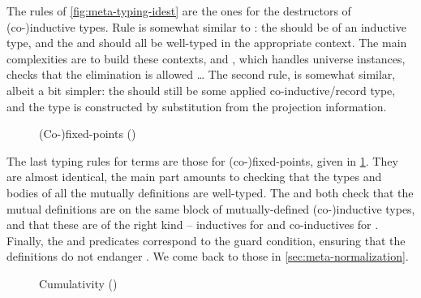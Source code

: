 \begin{figure*}[h]
  \ContinuedFloat
  \caption{(Co-)inductive destructors ()}
  \label{fig:meta-typing-idest}
\end{figure*}

The rules of \cref{fig:meta-typing-idest} are the ones for the destructors of (co-)inductive
types. Rule  is somewhat similar to \eg {}: the 
should be of an inductive type, and the  and  should all be well-typed
in the appropriate context. The main complexities are to build these contexts, and
, which handles universe instances, checks
that the elimination is allowed%
…
The second rule,  is somewhat similar, albeit a bit simpler: the 
should still be some applied co-inductive/record type, and the type is constructed by
substitution from the projection information.

\begin{figure}[h]
  \ContinuedFloat
  \caption{(Co-)fixed-points ()}
  \label{fig:meta-typing-fix}
\end{figure}

The last typing rules for terms are those for (co-)fixed-points,
given in \cref{fig:meta-typing-fix}. They are almost identical,
the main part amounts to checking that the types and bodies of all
the mutually definitions are well-typed.
The  and  both check that the mutual definitions are on
the same block of mutually-defined (co-)inductive types, and that these are of the right kind –
inductives for  and co-inductives for .
Finally, the  and  predicates correspond to the guard condition,
ensuring that the definitions do not endanger . We come back to those in
\cref{sec:meta-normalization}.

\begin{figure}[h]
  \ContinuedFloat
  \caption{Cumulativity ()}
  \label{fig:meta-typing-cumul}
\end{figure}

